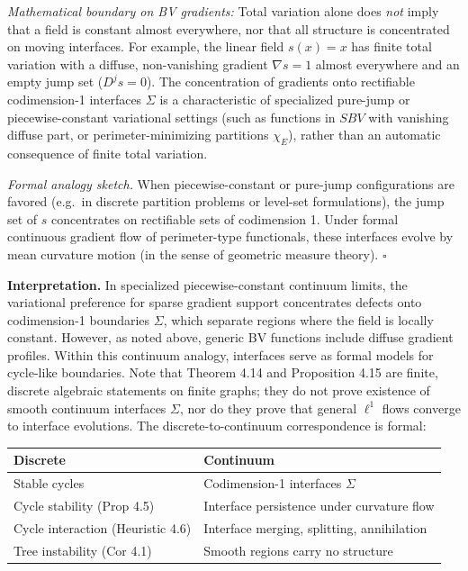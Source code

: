 \documentclass[
]{article}
\begin{document}
\emph{Mathematical boundary on BV gradients:} Total variation alone does \emph{not} imply that a field is constant almost everywhere, nor that all structure is concentrated on moving interfaces. For example, the linear field \(s(x) = x\) has finite total variation with a diffuse, non-vanishing gradient \(\nabla s = 1\) almost everywhere and an empty jump set (\(D^j s = 0\)). The concentration of gradients onto rectifiable codimension-1 interfaces \(\Sigma\) is a characteristic of specialized pure-jump or piecewise-constant variational settings (such as functions in \(SBV\) with vanishing diffuse part, or perimeter-minimizing partitions \(\chi_E\)), rather than an automatic consequence of finite total variation.

\emph{Formal analogy sketch.} When piecewise-constant or pure-jump configurations are favored (e.g.~in discrete partition problems or level-set formulations), the jump set of \(s\) concentrates on rectifiable sets of codimension 1. Under formal continuous gradient flow of perimeter-type functionals, these interfaces evolve by mean curvature motion (in the sense of geometric measure theory). \(\square\)

\textbf{Interpretation.} In specialized piecewise-constant continuum limits, the variational preference for sparse gradient support concentrates defects onto codimension-1 boundaries \(\Sigma\), which separate regions where the field is locally constant. However, as noted above, generic BV functions include diffuse gradient profiles. Within this continuum analogy, interfaces serve as formal models for cycle-like boundaries. Note that Theorem 4.14 and Proposition 4.15 are finite, discrete algebraic statements on finite graphs; they do not prove existence of smooth continuum interfaces \(\Sigma\), nor do they prove that general \(\ell^1\) flows converge to interface evolutions. The discrete-to-continuum correspondence is formal:

\begin{longtable}[]{@{}
  >{\raggedright\arraybackslash}p{}
  >{\raggedright\arraybackslash}p{}@{}}
\toprule\noalign{}
\begin{minipage}[b]{\linewidth}\raggedright
Discrete
\end{minipage} & \begin{minipage}[b]{\linewidth}\raggedright
Continuum
\end{minipage} \\
\midrule\noalign{}
\endhead
\bottomrule\noalign{}
\endlastfoot
Stable cycles & Codimension-1 interfaces \(\Sigma\) \\
Cycle stability (Prop 4.5) & Interface persistence under curvature flow \\
Cycle interaction (Heuristic 4.6) & Interface merging, splitting, annihilation \\
Tree instability (Cor 4.1) & Smooth regions carry no structure \\
\end{longtable}
\end{document}
